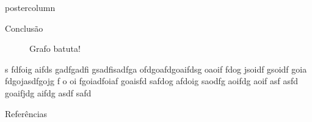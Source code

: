 \documentclass[final]{beamer}
\begin{document}
\begin{frame}
\begin{columns}
\begin{column}{.5\textwidth}
\begin{beamercolorbox}[center,wd=\textwidth]{postercolumn}
\begin{minipage}[T]{.95\textwidth}
{\begin{block}{Conclusão}
                
                \begin{figure}[htp]
                  \centering
                  \caption{Grafo batuta!}
                \end{figure}
s fdfoig aifds gadfgadfi gsadfisadfga ofdgoafdgoaifdsg oaoif   fdog jsoidf gsoidf goia fdgojasdfgojg f o oi fgoiadfoiaf goaisfd safdog afdoig saodfg aoifdg aoif asf asfd goaifjdg aifdg asdf safd            \end{block}
\vspace*{0.2cm} 
            \begin{block}{Referências}
            \small
             
            
\vspace*{0.2cm} 
            \end{block}
            \vfill
          }
        \end{minipage}
      \end{beamercolorbox}
    \end{column}


  \end{columns}
\end{frame}
\end{document}

